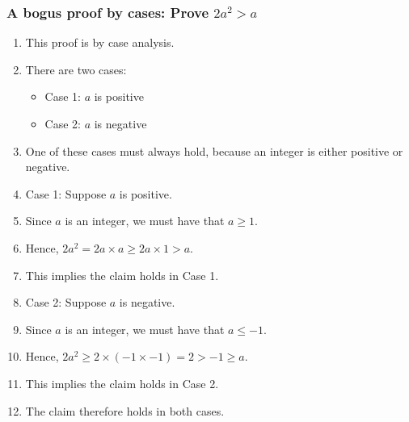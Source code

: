 \begin{frame}
  \frametitle{A bogus proof by cases: Prove $2a^2 > a$}
  \begin{enumerate}
  \item This proof is by case analysis.
  \item There are two cases:
    \begin{itemize}
      \item Case 1: $a$ is positive
      \item Case 2: $a$ is negative
    \end{itemize}
  \item One of these cases must always hold, because an integer is either positive or negative.
  \item Case 1: Suppose $a$ is positive.
  \item Since $a$ is an integer, we must have that $a \geq 1$.
  \item Hence, $2a^2 = 2a\times a \geq 2a\times 1 > a$.
  \item This implies the claim holds in Case 1.
  \item Case 2: Suppose $a$ is negative.
  \item Since $a$ is an integer, we must have that $a \leq -1$.
  \item Hence, $2a^2 \geq 2\times (-1 \times -1) = 2 > -1 \geq a$.
  \item This implies the claim holds in Case 2.
  \item The claim therefore holds in both cases.
  \end{enumerate}
\end{frame}
